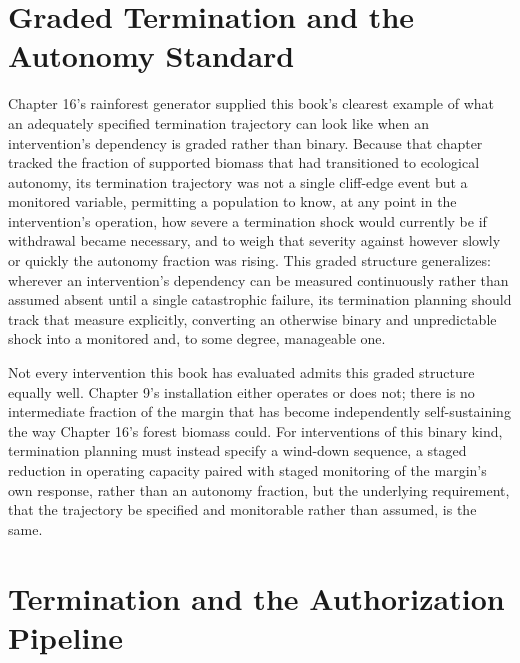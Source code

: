 \documentclass[11pt,oneside]{book}
\begin{document}
\section*{Graded Termination and the Autonomy Standard}

Chapter 16's rainforest generator supplied this book's clearest example of what an adequately specified termination trajectory can look like when an intervention's dependency is graded rather than binary. Because that chapter tracked the fraction of supported biomass that had transitioned to ecological autonomy, its termination trajectory was not a single cliff-edge event but a monitored variable, permitting a population to know, at any point in the intervention's operation, how severe a termination shock would currently be if withdrawal became necessary, and to weigh that severity against however slowly or quickly the autonomy fraction was rising. This graded structure generalizes: wherever an intervention's dependency can be measured continuously rather than assumed absent until a single catastrophic failure, its termination planning should track that measure explicitly, converting an otherwise binary and unpredictable shock into a monitored and, to some degree, manageable one.

Not every intervention this book has evaluated admits this graded structure equally well. Chapter 9's installation either operates or does not; there is no intermediate fraction of the margin that has become independently self-sustaining the way Chapter 16's forest biomass could. For interventions of this binary kind, termination planning must instead specify a wind-down sequence, a staged reduction in operating capacity paired with staged monitoring of the margin's own response, rather than an autonomy fraction, but the underlying requirement, that the trajectory be specified and monitorable rather than assumed, is the same.

\section*{Termination and the Authorization Pipeline}
\end{document}
